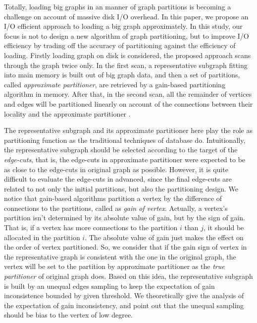 \documentclass{sig-alternate-2013}
\begin{document}
Totally, loading big graphs in an manner of graph partitions is becoming a challenge on account of massive disk I/O overhead. In this paper, we propose an I/O efficient approach to loading a big graph approximately. In this study, our focus is not to design a new algorithm of graph partitioning, but to improve I/O efficiency by trading off the accuracy of partitioning against the efficiency of loading. Firstly loading graph on disk is considered, the proposed approach scans through the graph twice only. In the first scan, a representative subgraph fitting into main memory is built out of big graph data, and then a set of partitions, called \textit{approximate partitioner}, are retrieved by a gain-based partitioning algorithm in memory. After that, in the second scan, all the remainder of vertices and edges will be partitioned linearly on account of the connections between their locality and the approximate partitioner .

The representative subgraph and its approximate partitioner here play the role as partitioning function as the traditional techniques of database do. Intuitionally, the representative subgraph should be selected according to the target of the \textit{edge-cuts}, that is, the edge-cuts in approximate partitioner were expected to be as close to the edge-cuts in original graph as possible. However, it is quite difficult to evaluate the edge-cuts in advanced, since the final edge-cuts are related to not only the initial partitions, but also the partitioning design. We notice that gain-based algorithms partition a vertex by the difference of connections to the partitions, called as \textit{gain of vertex}. Actually, a vertex's partition isn't determined by its absolute value of gain, but by the sign of gain. That is, if a vertex has more connections to the partition $i$ than $j$, it should be allocated in the partition $i$. The absolute value of gain just makes the effect on the order of vertex partitioned. So, we consider that if the gain sign of vertex in the representative graph is consistent with the one in the original graph, the vertex will be set to the partition by approximate partitioner as the \textit{true partitioner} of original graph does. Based on this idea, the representative subgraph is built by an unequal edges sampling to keep the expectation of gain inconsistence bounded by given threshold. We theoretically give the analysis of the expectation of gain inconsistency, and point out that the unequal sampling should be bias to the vertex of low degree.
\end{document}
